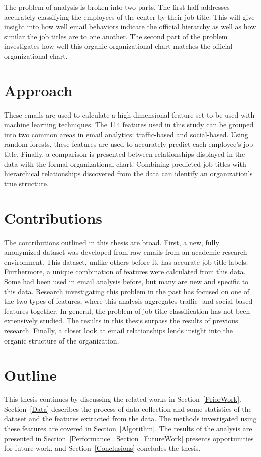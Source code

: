 \documentclass[12pt]{report}
\begin{document}
The problem of analysis is broken into two parts.
The first half addresses accurately classifying the employees of the center by their job title.
This will give insight into how well email behaviors indicate the official hierarchy as well as how similar the job titles are to one another.
The second part of the problem investigates how well this organic organizational chart matches the official organizational chart.



\section{Approach}
These emails are used to calculate a high-dimensional feature set to be used with machine learning techniques.
The 114 features used in this study can be grouped into two common areas in email analytics: traffic-based and social-based.
Using random forests, these features are used to accurately predict each employee's job title.
Finally, a comparison is presented between relationships displayed in the data with the formal organizational chart.
Combining predicted job titles with hierarchical relationships discovered from the data can identify an organization's true structure.

\section{Contributions}
The contributions outlined in this thesis are broad.  
First, a new, fully anonymized dataset was developed from raw emails from an academic research environment.  
This dataset, unlike others before it, has accurate job title labels.  
Furthermore, a unique combination of features were calculated from this data.  
Some had been used in email analysis before, but many are new and specific to this data.
Research investigating this problem in the past has focused on one of the two types of features, where this analysis aggregates traffic- and social-based features together.
In general, the problem of job title classification has not been extensively studied.  
The results in this thesis surpass the results of previous research.
Finally, a closer look at email relationships lends insight into the organic structure of the organization.


\section{Outline}
This thesis continues by discussing the related works in Section~\ref{PriorWork}.  
Section~\ref{Data} describes the process of data collection and some statistics of the dataset and the features extracted from the data.
The methods investigated using these features are covered in Section~\ref{Algorithm}.
The results of the analysis are presented in Section~\ref{Performance}.
 Section~\ref{FutureWork} presents opportunities for future work, and Section~\ref{Conclusions} concludes the thesis.
\end{document}

